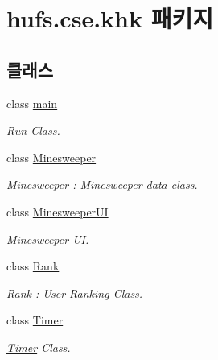\hypertarget{namespacehufs_1_1cse_1_1khk}{}\section{hufs.\+cse.\+khk 패키지}
\label{namespacehufs_1_1cse_1_1khk}
\subsection*{클래스}
\begin{DoxyCompactItemize}
\item 
class \hyperlink{classhufs_1_1cse_1_1khk_1_1main}{main}
\begin{DoxyCompactList}\small\item\em Run Class. \end{DoxyCompactList}\item 
class \hyperlink{classhufs_1_1cse_1_1khk_1_1_minesweeper}{Minesweeper}
\begin{DoxyCompactList}\small\item\em \hyperlink{classhufs_1_1cse_1_1khk_1_1_minesweeper}{Minesweeper} \+: \hyperlink{classhufs_1_1cse_1_1khk_1_1_minesweeper}{Minesweeper} data class. \end{DoxyCompactList}\item 
class \hyperlink{classhufs_1_1cse_1_1khk_1_1_minesweeper_u_i}{Minesweeper\+UI}
\begin{DoxyCompactList}\small\item\em \hyperlink{classhufs_1_1cse_1_1khk_1_1_minesweeper}{Minesweeper} UI. \end{DoxyCompactList}\item 
class \hyperlink{classhufs_1_1cse_1_1khk_1_1_rank}{Rank}
\begin{DoxyCompactList}\small\item\em \hyperlink{classhufs_1_1cse_1_1khk_1_1_rank}{Rank} \+: User Ranking Class. \end{DoxyCompactList}\item 
class \hyperlink{classhufs_1_1cse_1_1khk_1_1_timer}{Timer}
\begin{DoxyCompactList}\small\item\em \hyperlink{classhufs_1_1cse_1_1khk_1_1_timer}{Timer} Class. \end{DoxyCompactList}\end{DoxyCompactItemize}
